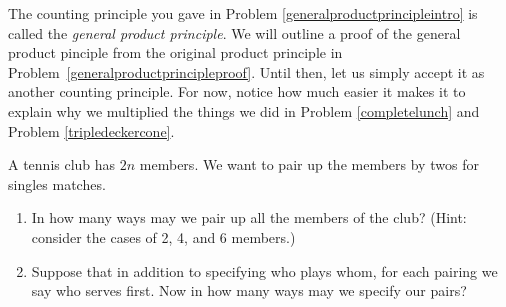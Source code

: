 The counting principle you gave in Problem
\ref{generalproductprincipleintro} is called the {\em general product
  principle}. We will outline
a proof of the general product pinciple from the original product
principle in Problem~\ref{generalproductprincipleproof}.  Until then,
let us simply accept it as another counting principle. For now, notice
how much easier it makes it to explain why we multiplied the things we
did in Problem \ref{completelunch} and Problem \ref{tripledeckercone}.
\bp

\itemi A tennis club has $2n$ members.  We want to pair up the
members by twos for singles matches. \label{tennispairings1} 
\begin{enumerate}
\item In how many ways may we pair up all the members of the club? (Hint: consider the cases
  of 2, 4, and 6 members.)\label{tennispairings1a} 

\item Suppose that in addition to specifying who plays whom, for each
  pairing we say who serves first.  Now in how many ways may we
  specify our pairs?
\end{enumerate}


